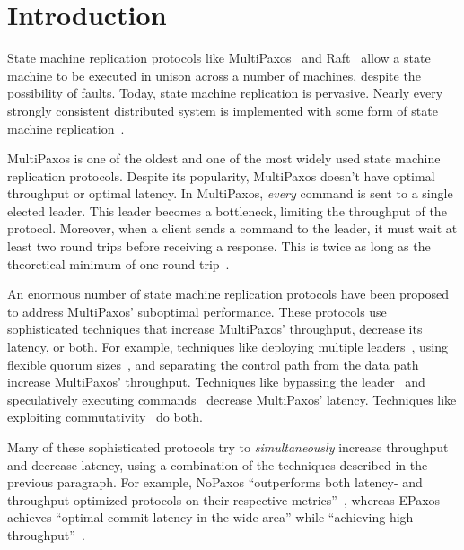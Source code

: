 \section{Introduction}
State machine replication protocols like MultiPaxos~\cite{lamport1998part,
lamport2001paxos} and Raft~\cite{ongaro2014search} allow a state machine to be
executed in unison across a number of machines, despite the possibility of
faults. Today, state machine replication is pervasive. Nearly every strongly
consistent distributed system is implemented with some form of state machine
replication~\cite{corbett2013spanner, thomson2012calvin, hunt2010zookeeper,
burrows2006chubby, baker2011megastore, cockroach2019website, cosmos2019website,
tidb2019website, yugabyte2019website}.

MultiPaxos is one of the oldest and one of the most widely used state machine
replication protocols. Despite its popularity, MultiPaxos doesn't have optimal
throughput or optimal latency. In MultiPaxos, \emph{every} command is sent to a
single elected leader. This leader becomes a bottleneck, limiting the
throughput of the protocol. Moreover, when a client sends a command to the
leader, it must wait at least two round trips before receiving a response. This
is twice as long as the theoretical minimum of one round
trip~\cite{lamport2006lower}.

An enormous number of state machine replication protocols have been proposed to
address MultiPaxos' suboptimal performance. These protocols use sophisticated
techniques that increase MultiPaxos' throughput, decrease its latency,
or both. For example, techniques like
  deploying multiple leaders~\cite{mao2008mencius, moraru2013there,
  arun2017speeding},
  using flexible quorum sizes~\cite{howard2016flexible, nawab2018dpaxos}, and
  separating the control path from the data path~\cite{biely2012s}
increase MultiPaxos' throughput. Techniques like
  bypassing the leader~\cite{lamport2006fast, ports2015designing, li2016just}
  and
  speculatively executing commands~\cite{ports2015designing, li2016just,
  park2019exploiting}
decrease MultiPaxos' latency. Techniques like
  exploiting commutativity~\cite{lamport2005generalized, moraru2013there,
  arun2017speeding, park2019exploiting}
do both.

Many of these sophisticated protocols try to \emph{simultaneously} increase
throughput and decrease latency, using a combination of the techniques
described in the previous paragraph. For example, NoPaxos ``outperforms both
latency- and throughput-optimized protocols on their respective
metrics''~\cite{li2016just}, whereas EPaxos achieves ``optimal commit latency
in the wide-area'' while ``achieving high throughput''~\cite{moraru2013there}.

